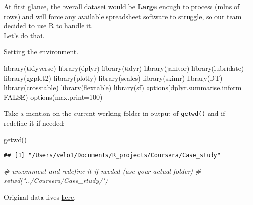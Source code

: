 \documentclass[
]{article}
\newenvironment{Shaded}{\begin{snugshade}}{\end{snugshade}}
\newcommand{\AttributeTok}[1]{\textcolor[rgb]{0.77,0.63,0.00}{#1}}
\newcommand{\CommentTok}[1]{\textcolor[rgb]{0.56,0.35,0.01}{\textit{#1}}}
\newcommand{\ConstantTok}[1]{\textcolor[rgb]{0.00,0.00,0.00}{#1}}
\newcommand{\DecValTok}[1]{\textcolor[rgb]{0.00,0.00,0.81}{#1}}
\newcommand{\FunctionTok}[1]{\textcolor[rgb]{0.00,0.00,0.00}{#1}}
\newcommand{\NormalTok}[1]{#1}
\begin{document}
At first glance, the overall dataset would be \textbf{Large} enough to
process (mlns of rows) and will force any available spreadsheet software
to struggle, so our team decided to use R to handle it.\\

Let's do that.

Setting the environment.

\begin{Shaded}
\begin{Highlighting}[]
\FunctionTok{library}\NormalTok{(tidyverse)}
\FunctionTok{library}\NormalTok{(dplyr)}
\FunctionTok{library}\NormalTok{(tidyr)}
\FunctionTok{library}\NormalTok{(janitor)}
\FunctionTok{library}\NormalTok{(lubridate)}
\FunctionTok{library}\NormalTok{(ggplot2)}
\FunctionTok{library}\NormalTok{(plotly)}
\FunctionTok{library}\NormalTok{(scales)}
\FunctionTok{library}\NormalTok{(skimr)}
\FunctionTok{library}\NormalTok{(DT)}
\FunctionTok{library}\NormalTok{(crosstable)}
\FunctionTok{library}\NormalTok{(flextable)}
\FunctionTok{library}\NormalTok{(sf)}
\FunctionTok{options}\NormalTok{(}\AttributeTok{dplyr.summarise.inform =} \ConstantTok{FALSE}\NormalTok{)}
\FunctionTok{options}\NormalTok{(}\AttributeTok{max.print=}\DecValTok{100}\NormalTok{)}
\end{Highlighting}
\end{Shaded}

Take a mention on the current working folder in output of
\texttt{getwd()} and if redefine it if needed:

\begin{Shaded}
\begin{Highlighting}[]
\FunctionTok{getwd}\NormalTok{()}
\end{Highlighting}
\end{Shaded}

\begin{verbatim}
## [1] "/Users/velo1/Documents/R_projects/Coursera/Case_study"
\end{verbatim}

\begin{Shaded}
\begin{Highlighting}[]
\CommentTok{\# uncomment and redefine it if needed (use your actual folder)}
\CommentTok{\# setwd("../Coursera/Case\_study/")}
\end{Highlighting}
\end{Shaded}

Original data lives
\href{https://divvy-tripdata.s3.amazonaws.com/index.html}{here}.\\
\end{document}
